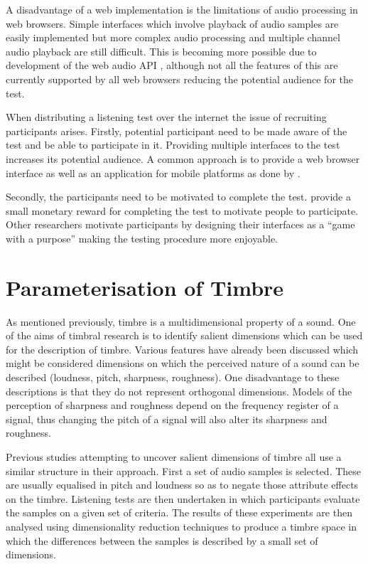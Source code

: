 			A disadvantage of a web implementation is the limitations of audio processing in web
			browsers.  Simple interfaces which involve playback of audio samples are easily implemented
			but more complex audio processing and multiple channel audio playback are still difficult.
			This is becoming more possible due to development of the web audio API
			\citep{adenot2015web}, although not all the features of this are currently supported by all
			web browsers reducing the potential audience for the test.

			When distributing a listening test over the internet the issue of recruiting participants
			arises.  Firstly, potential participant need to be made aware of the test and be able to
			participate in it.  Providing multiple interfaces to the test increases its potential
			audience. A common approach is to provide a web browser interface as well as an application
			for mobile platforms as done by \citet{huq2010crowdsourcing}.

			Secondly, the participants need to be motivated to complete the test.
			\citet{cartwright2013socialeq} provide a small monetary reward for completing the test to
			motivate people to participate. Other researchers motivate participants by designing their
			interfaces as a ``game with a purpose'' \citep{law2007tagatune, huq2010crowdsourcing,
			burgoyne2013hooked} making the testing procedure more enjoyable.

\section{Parameterisation of Timbre}
\label{sec:Timbre-Parameterisation}
	As mentioned previously, timbre is a multidimensional property of a sound. One of the aims of timbral research is to
	identify salient dimensions which can be used for the description of timbre. Various features have already been
	discussed which might be considered dimensions on which the perceived nature of a sound can be described (loudness,
	pitch, sharpness, roughness). One disadvantage to these descriptions is that they do not represent orthogonal
	dimensions. Models of the perception of sharpness and roughness depend on the frequency register of a signal, thus
	changing the pitch of a signal will also alter its sharpness and roughness.

	Previous studies attempting to uncover salient dimensions of timbre all use a similar structure in their approach.
	First a set of audio samples is selected. These are usually equalised in pitch and loudness so as to negate those
	attribute effects on the timbre. Listening tests are then undertaken in which participants evaluate the samples on a
	given set of criteria. The results of these experiments are then analysed using dimensionality reduction techniques
	to produce a timbre space in which the differences between the samples is described by a small set of dimensions.


